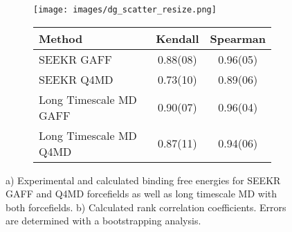 \begin{figure}
	\begin{subfigure}{\linewidth}
	\texttt{[image: images/dg\_scatter\_resize.png]}
	\caption{}
	\end{subfigure}
	\bigskip
	\begin{subfigure}{\linewidth}%
		\centering
	    \begin{tabular}{
	    	l  S[table-format = 2.3(3), separate-uncertainty] 
	  		S[table-format = 2.3(3), separate-uncertainty] 
	 	}%

			\textbf{Method} & \textbf{Kendall} & \textbf{Spearman}  \\
			\hline
	        SEEKR GAFF      &    0.88(08)           &    0.96(05)            \\ 
	        SEEKR Q4MD      &    0.73(10)           &    0.89(06)             \\ 
	        Long Timescale MD GAFF      &    0.90(07)           &    0.96(04)                     \\ 
	        Long Timescale MD Q4MD      &    0.87(11)           &    0.94(06)                     \\ 
	     

	    \end{tabular}
        \caption{}
	\end{subfigure}
	\caption{a) Experimental and calculated binding free energies for SEEKR GAFF and Q4MD forcefields as well as long timescale MD with both forcefields. b) Calculated rank correlation coefficients. Errors are determined with a bootstrapping analysis. }
	
	\label{fig:dg_scatter}
\end{figure}